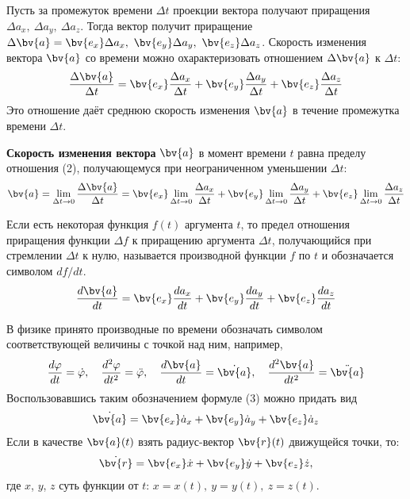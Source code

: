 Пусть за промежуток времени $\Delta t$ проекции вектора получают приращения $\Delta a_x,\ \Delta a_y,\ \Delta a_z$. Тогда вектор получит приращение $\Delta \bv{a} = \bv{e_x}\Delta a_x,\ \bv{e_y}\Delta a_y,\ \bv{e_z}\Delta a_z$. Скорость изменения вектора $\bv{a}$ со времени можно охарактеризовать отношением $\Delta \bv{a}$ к $\Delta t$:
\begin{align}
    \frac{\Delta \bv{a}}{\Delta t} = \bv{e_x}\frac{\Delta a_x}{\Delta t} + \bv{e_y}\frac{\Delta a_y}{\Delta t} + \bv{e_z}\frac{\Delta a_z}{\Delta t}
\end{align}
Это отношение даёт среднюю скорость изменения $\bv{a}$ в течение промежутка времени $\Delta t$.
\begin{definition}
    \textbf{Скорость изменения вектора} $\bv{a}$ в момент времени $t$ равна пределу отношения (2), получающемуся при неограниченном уменьшении $\Delta t$:
    \begin{gather*}
        \bv{a} = \lim_{\Delta t \to 0} \frac{\Delta \bv{a}}{\Delta t} = \bv{e_x} \lim_{\Delta t \to 0} \frac{\Delta a_x}{\Delta t} + \bv{e_y} \lim_{\Delta t \to 0} \frac{\Delta a_y}{\Delta t} + \bv{e_z} \lim_{\Delta t \to 0} \frac{\Delta a_z}{\Delta t}
    \end{gather*}
\end{definition}
Если есть некоторая функция $f(t)$ аргумента $t$, то предел отношения приращения функции $\Delta f$ к приращению аргумента $\Delta t$, получающийся при стремлении $\Delta t$  к нулю, называется производной функции $f$ по $t$ и обозначается символом $df/dt$.
\begin{gather}
    \frac{d \bv{a}}{d t} = \bv{e_x} \frac{d a_x}{d t} + \bv{e_y} \frac{d a_y}{d t} + \bv{e_z} \frac{d a_z}{d t}
\end{gather}

В физике принято производные по времени обозначать символом соответствующей величины с точкой над ним, например,
\begin{gather*}
    \frac{d \varphi}{dt} = \dot{\varphi},\quad \frac{d^2 \varphi}{dt^2} = \ddot{\varphi},\quad \frac{d \bv{a}}{dt} = \dot{\bv{a}},\quad \frac{d^2 \bv{a}}{dt^2} = \ddot{\bv{a}}
\end{gather*}
Воспользовавшись таким обозначением формуле (3) можно придать вид
\begin{gather}
    \dot{\bv{a}} = \bv{e_x} \dot{a}_x + \bv{e_y} \dot{a}_y + \bv{e_z} \dot{a}_z
\end{gather}
Если в качестве $\bv{a}(t)$ взять радиус-вектор $\bv{r} (t)$ движущейся точки, то:
\begin{gather}
    \dot{\bv{r}} = \bv{e_x} \dot{x} + \bv{e_y} \dot{y} + \bv{e_z} \dot{z},
\end{gather}
где $x$, $y$, $z$ суть функции от $t$: $x = x(t),\ y = y(t),\ z = z(t)$.

